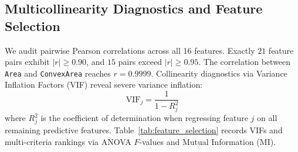 \documentclass[11pt,a4paper]{article}
\begin{document}
\subsection{Multicollinearity Diagnostics and Feature Selection}
\label{subsec:multicollinearity}

We audit pairwise Pearson correlations across all 16 features. Exactly $21$ feature pairs exhibit $|r| \ge 0.90$, and $15$ pairs exceed $|r| \ge 0.95$. The correlation between \texttt{Area} and \texttt{ConvexArea} reaches $r = 0.9999$. Collinearity diagnostics via Variance Inflation Factors (VIF) reveal severe variance inflation:
\begin{equation}
    \text{VIF}_j = \frac{1}{1 - R_j^2}
\end{equation}
where $R_j^2$ is the coefficient of determination when regressing feature $j$ on all remaining predictive features. Table~\ref{tab:feature_selection} records VIFs and multi-criteria rankings via ANOVA $F$-values and Mutual Information (MI).
\end{document}
